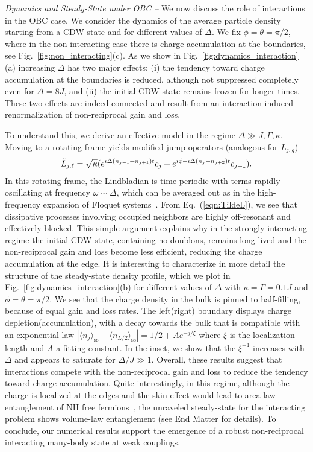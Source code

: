 \documentclass[floatfix,reprint,amsmath,amssymb,superscriptaddress,aps,prl]{revtex4-2}
\begin{document}
\emph{Dynamics and Steady-State under OBC --} We now discuss the role of interactions in the OBC case. We consider the dynamics of the average particle density starting from a CDW state and for different values of $\Delta$. We fix $\phi=\theta=\pi/2$, where in the non-interacting case there is charge accumulation at the boundaries, see Fig.~\ref{fig:non_interacting}(c). As we show in Fig.~\ref{fig:dynamics_interaction}(a) increasing $\Delta$ has two major effects: (i) the tendency toward charge accumulation at the boundaries is reduced, although not suppressed completely even for $\Delta=8J$, and (ii) the initial CDW state remains frozen for longer times. These two effects are indeed connected and result from an interaction-induced renormalization of non-reciprocal gain and loss.


To understand this, we derive an effective model in the regime $\Delta\gg J,\Gamma,\kappa$. Moving to a rotating frame yields modified jump operators (analogous for $L_{j,g}$)~\cite{supplementary_mat}
\begin{align}\label{eqn:TildeL}
\Tilde{L}_{j,\ell }=\sqrt{\kappa}(e^{i\Delta (n_{j-1}+n_{j+1})t} c_j+ e^{i\phi+i\Delta (n_{j}+n_{j+2})t} c_{j+1}).
\end{align}
In this rotating frame, the Lindbladian is time-periodic with terms rapidly oscillating at frequency $\omega\sim \Delta$, which can be averaged out as in the high-frequency expansion of Floquet systems~\cite{bukov2016schrieffer,seetharam2018absence,peronaci2018resonant}. From Eq.~(\ref{eqn:TildeL}), we see that dissipative processes involving occupied neighbors are highly off-resonant and effectively blocked. This simple argument explains why in the strongly interacting regime the initial CDW state, containing no doublons, remains long-lived and the non-reciprocal gain and loss become less efficient, reducing the charge accumulation at the edge. It is interesting to characterize in more detail the structure of the steady-state density profile, which we plot in Fig.~\ref{fig:dynamics_interaction}(b) for different values of $\Delta$ with $\kappa=\Gamma=0.1 J$ and $\phi=\theta=\pi/2$. We see that the charge density in the bulk is pinned to half-filling, because of equal gain and loss rates. The left(right) boundary displays charge depletion(accumulation), with a decay towards the bulk that is compatible with an exponential law $\left|\langle n_j\rangle_{\text{ss}}-\langle n_{L/2}\rangle _{\text{ss}}\right|=1/2+Ae^{-j/\xi}$ where $\xi$ is the localization length and $A$ a fitting constant. In the inset, we show that the $\xi^{-1}$ increases with $\Delta$ and appears to saturate for $\Delta/J\gg 1$. Overall, these results suggest that interactions compete with the non-reciprocal gain and loss to reduce the tendency toward charge accumulation. Quite interestingly, in this regime, although the charge is localized at the edges and the skin effect would lead to area-law entanglement of NH free fermions~\cite{kawabata2023entanglement}, the unraveled steady-state for the interacting problem shows volume-law entanglement (see End Matter for details). To conclude, our numerical results support the emergence of a robust non-reciprocal interacting many-body state at weak couplings.
\end{document}
